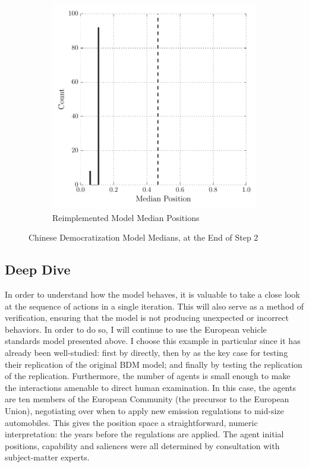 \begin{figure}
\begin{subfigure}{0.49\textwidth}
        \includegraphics[width=\textwidth]{BDM_Reproduction/Figures/New_ChinaModel}
        \caption{Reimplemented Model Median Positions}
    \end{subfigure}

    \caption[Chinese Democratization Model Medians]{Chinese Democratization Model Medians, at the End of Step 2}
    \label{fig:china_medians}
    \figSpace
\end{figure}


\subsection{Deep Dive} \label{deep-dive}

In order to understand how the model behaves, it is valuable to take a close look at the sequence of actions in a single iteration. This will also serve as a method of verification, ensuring that the model is not producing unexpected or incorrect behaviors. In order to do so, I will continue to use the European vehicle standards model presented above. I choose this example in particular since it has already been well-studied: first by \citet{bdm_1994} directly, then by \citet{scholz_2011} as the key case for testing their replication of the original BDM model; and finally by \citet{mckibben_sanders_2014} testing the replication of the replication. Furthermore, the number of agents is small enough to make the interactions amenable to direct human examination. In this case, the agents are ten members of the European Community (the precursor to the European Union), negotiating over when to apply new emission regulations to mid-size automobiles. This gives the position space a straightforward, numeric interpretation: the years before the regulations are applied. The agent initial positions, capability and saliences were all determined by consultation with subject-matter experts.

